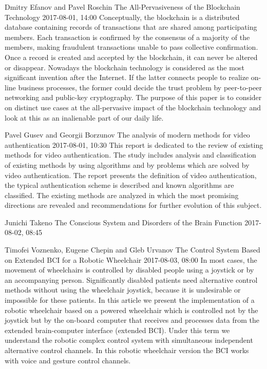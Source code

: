 \documentclass[10pt,fleqn,openany]{book} %
\begin{document}
\begin{enumerate}
		
		\paperabstract
		{Dmitry Efanov and Pavel Roschin}
		{The All-Pervasiveness of the Blockchain Technology}
		{2017-08-01, 14:00}
		{Conceptually, the blockchain is a distributed database containing records of transactions that are shared among participating members. Each transaction is confirmed by the consensus of a majority of the members, making fraudulent transactions unable to pass collective confirmation. Once a record is created and accepted by the blockchain, it can never be altered or disappear. Nowadays the blockchain technology is considered as the most significant invention after the Internet. If the latter connects people to realize on-line business processes, the former could decide the trust problem by peer-to-peer networking and public-key cryptography. The purpose of this paper is to consider on distinct use cases at the all-pervasive impact of the blockchain technology and look at this as an inalienable part of our daily life.}
		
		
		\paperabstract
		{Pavel Gusev and Georgii Borzunov}
		{The analysis of modern methods for video authentication}
		{2017-08-01, 10:30}
		{This report is dedicated to the review of existing methods for video authentication. The study includes analysis and classification of existing methods by using algorithms and by problems which are solved by video authentication. The report presents the definition of video authentication, the typical authentication scheme is described and known algorithms are classified. The existing methods are analyzed in which the most promising directions are revealed and recommendations for further evolution of this subject.}
		
		
		\paperabstract
		{Junichi Takeno}
		{The Conscious  System and Disorders of the Brain Function}
		{2017-08-02, 08:45}
		{}
		
		
		\paperabstract
		{Timofei Voznenko, Eugene Chepin and Gleb Urvanov}
		{The Control System Based on Extended BCI for a Robotic Wheelchair}
		{2017-08-03, 08:00}
		{In most cases, the movement of wheelchairs is controlled by disabled people using a joystick or by an accompanying person. Significantly disabled patients need alternative control methods without using the wheelchair joystick, because it is undesirable or impossible for these patients. In this article we present the implementation of a robotic wheelchair based on a powered wheelchair which is controlled not by the joystick but by the on-board computer that receives and processes data from the extended brain-computer interface (extended BCI). Under this term we understand the robotic complex control system with simultaneous independent alternative control channels. In this robotic wheelchair version the BCI works with voice and gesture control channels.}
		

\end{enumerate}
\end{document}
